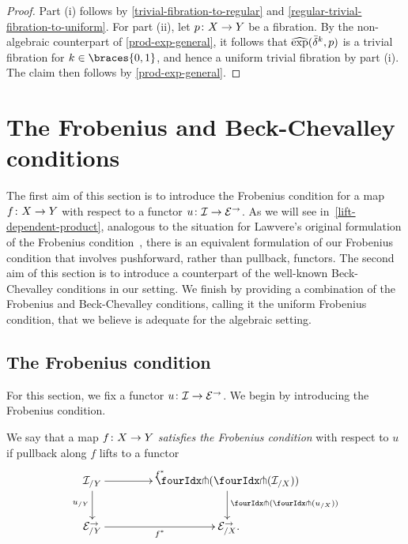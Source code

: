 \documentclass[reqno,10pt,a4paper,oneside,draft]{amsart}
\begin{document}
\begin{proof}
Part (i) follows by \cref{trivial-fibration-to-regular} and \cref{regular-trivial-fibration-to-uniform}.
For part (ii), let $p \colon X \to Y$ be a fibration.
By the non-algebraic counterpart of \cref{prod-exp-general}, it follows that $\operatorname{\widehat{exp}}(\bar{\delta}^k, p)$ is a trivial fibration for $k \in \braces{0, 1}$, and hence a uniform trivial fibration by part (i).
The claim then follows by \cref{prod-exp-general}.
\end{proof}


\section{The Frobenius and Beck-Chevalley conditions}
\label{sec:frobc}

The first aim of this section is to introduce the Frobenius condition for a map $f \colon X \to Y$ with respect to a functor $u \colon \mathcal{I} \to \mathcal{E}^\to$.
As we will see in~\cref{lift-dependent-product}, analogous to the situation for Lawvere's original formulation of the Frobenius condition~\cite{lawvere-equality}, there is an equivalent formulation of our Frobenius condition that involves pushforward, rather than pullback, functors.
The second aim of this section is to introduce a counterpart of the well-known Beck-Chevalley conditions in our setting.
We finish by providing a combination of the Frobenius and Beck-Chevalley conditions, calling it the uniform Frobenius condition, that we believe is adequate for the algebraic setting.

\subsection*{The Frobenius condition}

For this section, we fix a functor $u \colon \mathcal{I} \to \mathcal{E}^\to$.
We begin by introducing the Frobenius condition.

\begin{definition} \label{thm:frobenius-def}
We say that a map $f \colon X \to Y$ \emph{satisfies the Frobenius condition} with respect to $u$ if pullback along $f$ lifts to a functor
\[
\xymatrix@C=1.5cm{
  \cal{I}_{/Y}
  \ar[r]^{f^*}
  \ar[d]_{u_{/Y}}
&
  \liftl{(\liftr{(\cal{I}_{/X})})}
  \ar[d]^{\liftl{(\liftr{(u_{/X})})}}
\\
  \catE_{/Y}^\to \ar[r]_{f^*}
&
  \catE_{/X}^\to
\rlap{.}}
\]
\end{definition}
\end{document}
